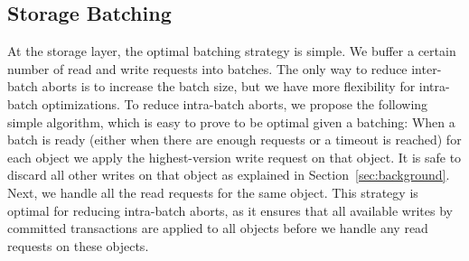 \subsection{Storage Batching}
At the storage layer, the optimal batching strategy is simple. We buffer a certain number of read and write requests into batches. The only way to reduce inter-batch aborts is to increase the batch size, but we have more flexibility for intra-batch optimizations. To reduce intra-batch aborts, we propose the following simple algorithm, which is easy to prove to be optimal given a batching:  When a batch is ready (either when there are enough requests or a timeout is reached) for each object we apply the highest-version write request on that object. It is safe to discard all other writes on that object as explained in Section~\ref{sec:background}. Next, we handle all the read requests for the same object. This strategy is optimal for reducing intra-batch aborts, as it ensures that all available writes by committed transactions are applied to all objects before we handle any read requests on these objects. 






